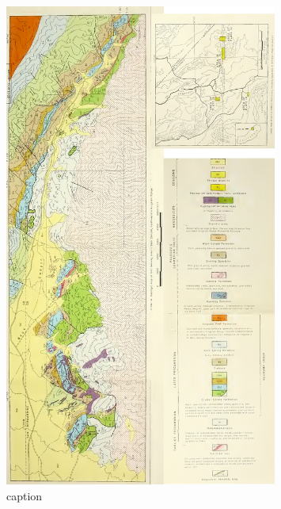 \documentclass[11pt]{article}
\begin{document}
\begin{figure}[htbp]
	\centering
	\includegraphics[width=0.8\textwidth]{figures/Wright1968.jpg}
	\caption{caption}
	\label{fig:label}
\end{figure}
\end{document}
